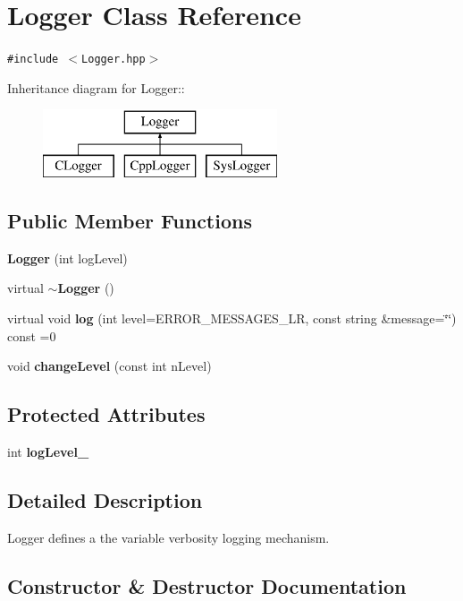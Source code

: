 \section{Logger Class Reference}
\label{classLogger}
{\tt \#include $<$Logger.hpp$>$}

Inheritance diagram for Logger::\begin{figure}[H]
\begin{center}
\leavevmode
\includegraphics[height=2cm]{classLogger}
\end{center}
\end{figure}
\subsection*{Public Member Functions}
\begin{CompactItemize}
\item 
{\bf Logger} (int log\-Level)\label{classLogger_a0}

\item 
virtual {\bf $\sim$Logger} ()
\item 
virtual void {\bf log} (int level=ERROR\_\-MESSAGES\_\-LR, const string \&message=\char`\"{}\char`\"{}) const =0
\item 
void {\bf change\-Level} (const int n\-Level)
\end{CompactItemize}
\subsection*{Protected Attributes}
\begin{CompactItemize}
\item 
int {\bf log\-Level\_\-}
\end{CompactItemize}


\subsection{Detailed Description}
Logger defines a the variable verbosity logging mechanism.



\subsection{Constructor \& Destructor Documentation}
